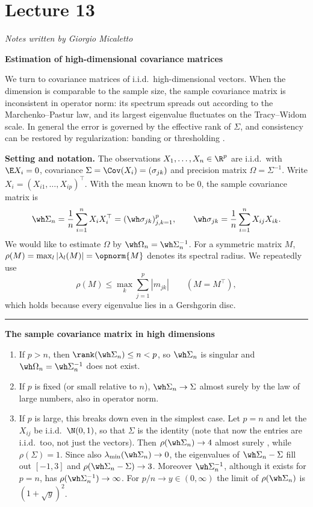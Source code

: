 \section{Lecture 13}
\noindent\textit{Notes written by Giorgio Micaletto}

\textbf{Estimation of high-dimensional covariance matrices}

We turn to covariance matrices of i.i.d.\ high-dimensional vectors. When the dimension is comparable to the sample size, the sample covariance matrix is inconsistent in operator norm: its spectrum spreads out according to the Marchenko--Pastur law, and its largest eigenvalue fluctuates on the Tracy--Widom scale. In general the error is governed by the effective rank of \(\Sigma\), and consistency can be restored by regularization: banding \citep{BL08a} or thresholding \citep{BL08b}.

\textbf{Setting and notation.} The observations \(X_1, \dots, X_n \in \R^p\) are i.i.d.\ with \(\E X_i = 0\), covariance \(\Sigma = \Cov(X_i) = (\sigma_{jk})\) and precision matrix \(\Omega = \Sigma^{-1}\). Write \(X_i = (X_{i1}, \dots, X_{ip})^\top\). With the mean known to be \(0\), the sample covariance matrix is
\[\wh\Sigma_n = \frac{1}{n} \sum_{i=1}^n X_i X_i^\top = (\wh\sigma_{jk})_{j,k=1}^p, \qquad \wh\sigma_{jk} = \frac{1}{n} \sum_{i=1}^n X_{ij} X_{ik}.\]
We would like to estimate \(\Omega\) by \(\wh\Omega_n = \wh\Sigma_n^{-1}\). For a symmetric matrix \(M\), \(\rho(M) = \max_l |\lambda_l(M)| = \opnorm{M}\) denotes its spectral radius. We repeatedly use
\begin{equation*}
\rho(M) \le \max_k \sum_{j=1}^p |m_{jk}| \qquad (M = M^\top),
\end{equation*}
which holds because every eigenvalue lies in a Gershgorin disc.

\begin{center}\rule{0.5\linewidth}{0.5pt}\end{center}

\textbf{The sample covariance matrix in high dimensions}

\begin{enumerate}[label=(\roman*)]
\item If \(p > n\), then \(\rank(\wh\Sigma_n) \le n < p\), so \(\wh\Sigma_n\) is singular and \(\wh\Omega_n = \wh\Sigma_n^{-1}\) does not exist.
\item If \(p\) is fixed (or small relative to \(n\)), \(\wh\Sigma_n \to \Sigma\) almost surely by the law of large numbers, also in operator norm.
\item If \(p\) is large, this breaks down even in the simplest case. Let \(p = n\) and let the \(X_{ij}\) be i.i.d.\ \(\N(0,1)\), so that \(\Sigma\) is the identity (note that now the entries are i.i.d.\ too, not just the vectors). Then \(\rho(\wh\Sigma_n) \to 4\) almost surely \citep{Gem80,YBK88}, while \(\rho(\Sigma) = 1\). Since also \(\lambda_{\min}(\wh\Sigma_n) \to 0\), the eigenvalues of \(\wh\Sigma_n - \Sigma\) fill out \([-1, 3]\) and \(\rho(\wh\Sigma_n - \Sigma) \to 3\). Moreover \(\wh\Sigma_n^{-1}\), although it exists for \(p = n\), has \(\rho(\wh\Sigma_n^{-1}) \to \infty\). For \(p/n \to y \in (0, \infty)\) the limit of \(\rho(\wh\Sigma_n)\) is \((1 + \sqrt y)^2\).
\end{enumerate}

